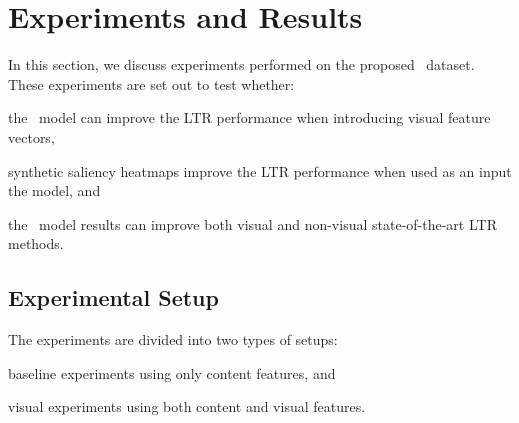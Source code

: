 
%



\section{Experiments and Results}
In this section, we discuss experiments performed on the proposed \datasetname~dataset.
These experiments are set out to test whether:
\begin{inparaenum}[(i)]
\item the \modelname~model can improve the \ac{LTR} performance when introducing visual feature vectors, 
\item synthetic saliency heatmaps improve the \ac{LTR} performance when used as an input the \modelname{} model, and
\item the \modelname~model results can improve both visual and non-visual state-of-the-art \ac{LTR} methods.
\end{inparaenum}

\subsection{Experimental Setup}
The experiments are divided into two types of setups:
\begin{inparaenum}[(i)]
\item baseline experiments using only content features, and
\item visual experiments using both content and visual features.
\end{inparaenum}

